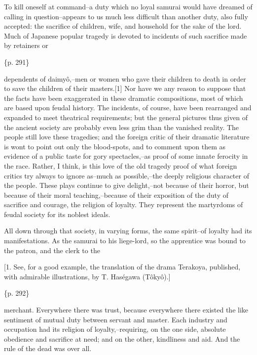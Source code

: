To kill oneself at command--a duty which no loyal samurai would have dreamed of calling in question--appears to us much less difficult than another duty, also fully accepted: the sacrifice of children, wife, and household for the sake of the lord. Much of Japanese popular tragedy is devoted to incidents of such sacrifice made by retainers or

\{p. 291\}

dependents of daimyô,--men or women who gave their children to death in order to save the children of their masters.[1] Nor have we any reason to suppose that the facts have been exaggerated in these dramatic compositions, most of which are based upon feudal history. The incidents, of course, have been rearranged and expanded to meet theatrical requirements; but the general pictures thus given of the ancient society are probably even less grim than the vanished reality. The people still love these tragedies; and the foreign critic of their dramatic literature is wont to point out only the blood-spots, and to comment upon them as evidence of a public taste for gory spectacles,--as proof of some innate ferocity in the race. Rather, I think, is this love of the old tragedy proof of what foreign critics try always to ignore as--much as possible,--the deeply religious character of the people. These plays continue to give delight,--not because of their horror, but because of their moral teaching,--because of their exposition of the duty of sacrifice and courage, the religion of loyalty. They represent the martyrdoms of feudal society for its noblest ideals.

All down through that society, in varying forms, the same spirit--of loyalty had its manifestations. As the samurai to his liege-lord, so the apprentice was bound to the patron, and the clerk to the

[1. See, for a good example, the translation of the drama Terakoya, published, with admirable illustrations, by T. Haségawa (Tôkyô).]

\{p. 292\}

merchant. Everywhere there was trust, because everywhere there existed the like sentiment of mutual duty between servant and master. Each industry and occupation had its religion of loyalty,--requiring, on the one side, absolute obedience and sacrifice at need; and on the other, kindliness and aid. And the rule of the dead was over all.



